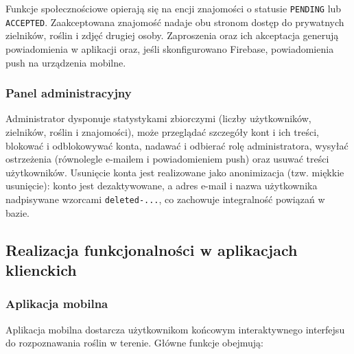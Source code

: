 \documentclass[12pt,a4paper]{article}
\begin{document}
Funkcje spo\l{}eczno\'sciowe opieraj\k{a} si\k{e} na encji znajomo\'sci o statusie \texttt{PENDING} lub \texttt{ACCEPTED}. Zaakceptowana znajomo\'s\'c nadaje obu stronom dost\k{e}p do prywatnych zielnik\'ow, ro\'slin i zdj\k{e}\'c drugiej osoby. Zaproszenia oraz ich akceptacja generuj\k{a} powiadomienia w aplikacji oraz, je\'sli skonfigurowano Firebase, powiadomienia push na urz\k{a}dzenia mobilne.

\subsubsection{Panel administracyjny}

Administrator dysponuje statystykami zbiorczymi (liczby u\.zytkownik\'ow, zielnik\'ow, ro\'slin i znajomo\'sci), mo\.ze przegl\k{a}da\'c szczeg\'o\l{}y kont i ich tre\'sci, blokowa\'c i odblokowywa\'c konta, nadawa\'c i odbiera\'c rol\k{e} administratora, wysy\l{}a\'c ostrze\.zenia (r\'ownolegle e-mailem i powiadomieniem push) oraz usuwa\'c tre\'sci u\.zytkownik\'ow. Usuni\k{e}cie konta jest realizowane jako anonimizacja (tzw. mi\k{e}kkie usuni\k{e}cie): konto jest dezaktywowane, a adres e-mail i nazwa u\.zytkownika nadpisywane wzorcami \texttt{deleted-...}, co zachowuje integralno\'s\'c powi\k{a}za\'n w bazie.

\subsection{Realizacja funkcjonalno\'sci w aplikacjach klienckich}

\subsubsection{Aplikacja mobilna}

Aplikacja mobilna dostarcza u\.zytkownikom ko\'ncowym interaktywnego interfejsu do rozpoznawania ro\'slin w terenie. G\l{}\'owne funkcje obejmuj\k{a}:
\end{document}
